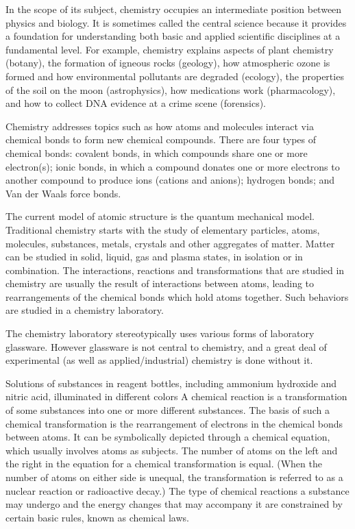 \documentclass[
]{book}
\begin{document}
In the scope of its subject, chemistry occupies an intermediate position between physics and biology. It is sometimes called the central science because it provides a foundation for understanding both basic and applied scientific disciplines at a fundamental level. For example, chemistry explains aspects of plant chemistry (botany), the formation of igneous rocks (geology), how atmospheric ozone is formed and how environmental pollutants are degraded (ecology), the properties of the soil on the moon (astrophysics), how medications work (pharmacology), and how to collect DNA evidence at a crime scene (forensics).

Chemistry addresses topics such as how atoms and molecules interact via chemical bonds to form new chemical compounds. There are four types of chemical bonds: covalent bonds, in which compounds share one or more electron(s); ionic bonds, in which a compound donates one or more electrons to another compound to produce ions (cations and anions); hydrogen bonds; and Van der Waals force bonds.

The current model of atomic structure is the quantum mechanical model. Traditional chemistry starts with the study of elementary particles, atoms, molecules, substances, metals, crystals and other aggregates of matter. Matter can be studied in solid, liquid, gas and plasma states, in isolation or in combination. The interactions, reactions and transformations that are studied in chemistry are usually the result of interactions between atoms, leading to rearrangements of the chemical bonds which hold atoms together. Such behaviors are studied in a chemistry laboratory.

The chemistry laboratory stereotypically uses various forms of laboratory glassware. However glassware is not central to chemistry, and a great deal of experimental (as well as applied/industrial) chemistry is done without it.

Solutions of substances in reagent bottles, including ammonium hydroxide and nitric acid, illuminated in different colors
A chemical reaction is a transformation of some substances into one or more different substances. The basis of such a chemical transformation is the rearrangement of electrons in the chemical bonds between atoms. It can be symbolically depicted through a chemical equation, which usually involves atoms as subjects. The number of atoms on the left and the right in the equation for a chemical transformation is equal. (When the number of atoms on either side is unequal, the transformation is referred to as a nuclear reaction or radioactive decay.) The type of chemical reactions a substance may undergo and the energy changes that may accompany it are constrained by certain basic rules, known as chemical laws.
\end{document}
